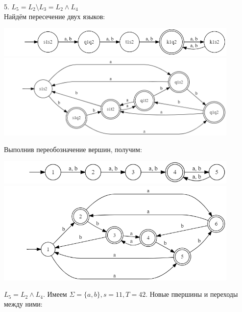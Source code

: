 \documentclass{article}
\begin{document}
    5. $L_5 = L_2 \setminus L_3 = L_2 \wedge L_4 $\\
    Найдём пересечение двух языков:
    \begin{center}
        \includegraphics[width=0.9\textwidth]{task2/pic2.2res(simplier)}
        \includegraphics[width=0.9\textwidth]{task2/pic3.4}
    \end{center}
    Выполнив переобозначение вершин, получим: \newline
    \begin{center}
        \includegraphics[width=0.9\textwidth]{task2/pic5.1}
        \includegraphics[width=0.9\textwidth]{task2/pic5.2}
    \end{center}
    $L_5 = L_2 \wedge L_4$. Имеем $\Sigma = \{a, b\}, s = 11, T = 42$.
    Новые пвершины и переходы между ними:
\end{document}
